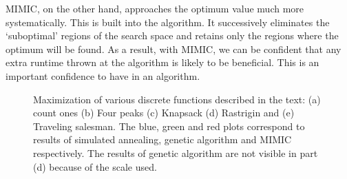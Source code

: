 \documentclass[10pt,letterpaper]{article}
\begin{document}
MIMIC, on the other hand, approaches the optimum value much more systematically. This is built into the algorithm. It successively eliminates the `suboptimal' regions of the search space and retains only the regions where the optimum will be found. As a result, with MIMIC, we can be confident that any extra runtime thrown at the algorithm is likely to be beneficial. This is an important confidence to have in an algorithm.
\begin{figure}[!h]
	\begin{center}
	\caption{Maximization of various discrete functions described in the text: (a) count ones (b) Four peaks (c) Knapsack (d) Rastrigin and (e) Traveling salesman. The blue, green and red plots correspond to results of simulated annealing, genetic algorithm and MIMIC respectively. The results of genetic algorithm are not visible in part (d) because of the scale used. \label{part2}}
	\end{center}
\end{figure}
\end{document}
